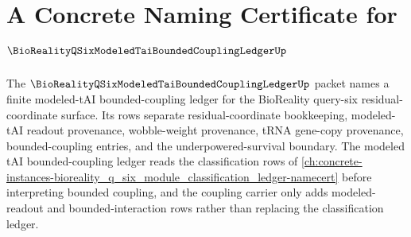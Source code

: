 \chapter{A Concrete Naming Certificate for $\BioRealityQSixModeledTaiBoundedCouplingLedgerUp$}
\label{ch:concrete-instances-bioreality_q_six_modeled_tai_bounded_coupling-namecert}

The $\BioRealityQSixModeledTaiBoundedCouplingLedgerUp$ packet names a finite modeled-tAI bounded-coupling ledger for the BioReality query-six residual-coordinate surface. Its rows separate residual-coordinate bookkeeping, modeled-tAI readout provenance, wobble-weight provenance, tRNA gene-copy provenance, bounded-coupling entries, and the underpowered-survival boundary. The modeled tAI bounded-coupling ledger reads the classification rows of \autoref{ch:concrete-instances-bioreality_q_six_module_classification_ledger-namecert} before interpreting bounded coupling, and the coupling carrier only adds modeled-readout and bounded-interaction rows rather than replacing the classification ledger.


